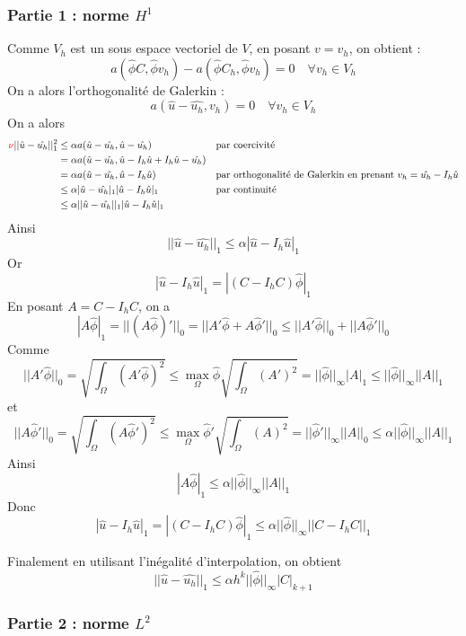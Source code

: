 \subsubsection{Partie 1 : norme $H^1$}

Comme $V_h$ est un sous espace vectoriel de $V$, en posant $v=v_h$, on obtient :
$$a(\hat{\phi}C,\hat{\phi}v_h)-a(\hat{\phi}C_h,\hat{\phi}v_h)=0 \quad \forall v_h\in V_h$$
On a alors l'orthogonalité de Galerkin : \color{red}{(ATTENTION : Abus de notation sur $v_h$ !)}\color{black}
$$a(\hat{u}-\hat{u_h},v_h)=0 \quad \forall v_h\in V_h$$
On a alors
\begin{align*}
	\color{red}{\nu}\color{black}||\hat{u}-\hat{u_h}||_1^2&\le\alpha a(\hat{u}-\hat{u_h},\hat{u}-\hat{u_h}) &&\text{par coercivité} \\
	&=\alpha a(\hat{u}-\hat{u_h},\hat{u}-I_h\hat{u}+I_h\hat{u}-\hat{u_h}) \\
	&=\alpha a(\hat{u}-\hat{u_h},\hat{u}-I_h\hat{u}) &&\text{par orthogonalité de Galerkin en prenant } v_h=\hat{u_h}-I_h\hat{u} \\
	&\le\alpha |\hat{u}-\hat{u_h}|_1|\hat{u}-I_h\hat{u}|_1 &&\text{par continuité} \\
	&\le\alpha ||\hat{u}-\hat{u_h}||_1|\hat{u}-I_h\hat{u}|_1
\end{align*}
Ainsi
$$||\hat{u}-\hat{u_h}||_1\le\alpha|\hat{u}-I_h\hat{u}|_1$$
Or 
$$|\hat{u}-I_h\hat{u}|_1=|(C-I_hC)\hat{\phi}|_1$$
En posant $A=C-I_hC$, on a
$$|A\hat{\phi}|_1=||(A\hat{\phi})'||_0=||A'\hat{\phi}+A\hat{\phi}'||_0\le||A'\hat{\phi}||_0+||A\hat{\phi}'||_0$$
Comme
$$||A'\hat{\phi}||_0=\sqrt{\int_\Omega(A'\hat{\phi})^2}\le \max_\Omega \hat{\phi}\sqrt{\int_\Omega(A')^2}=||\hat{\phi}||_\infty|A|_1\le||\hat{\phi}||_\infty||A||_1$$
et
$$||A\hat{\phi}'||_0=\sqrt{\int_\Omega(A\hat{\phi}')^2}\le \max_\Omega \hat{\phi}'\sqrt{\int_\Omega(A)^2}=||\hat{\phi}'||_\infty||A||_0\le \alpha||\hat{\phi}||_\infty||A||_1$$
Ainsi
$$|A\hat{\phi}|_1\le\alpha ||\hat{\phi}||_\infty||A||_1$$
Donc
$$|\hat{u}-I_h\hat{u}|_1=|(C-I_hC)\hat{\phi}|_1\le\alpha ||\hat{\phi}||_\infty||C-I_hC||_1$$

Finalement en utilisant l'inégalité d'interpolation, on obtient
\begin{equation}
	\boxed{||\hat{u}-\hat{u_h}||_1\le\alpha h^k ||\hat{\phi}||_\infty |C|_{k+1}}
	\label{norme_H1}
\end{equation} 

\subsubsection{Partie 2 : norme $L^2$}

